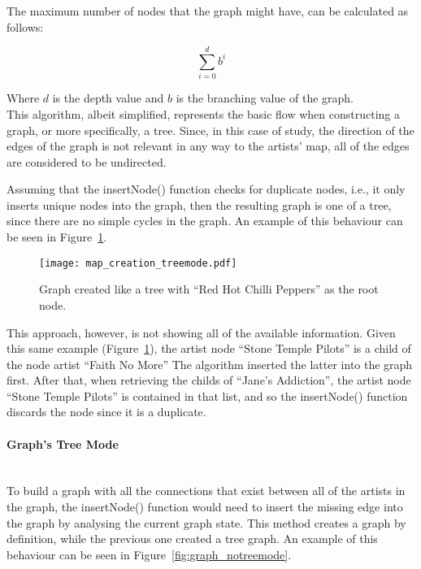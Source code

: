       The maximum number of nodes that the graph might have, can be calculated as follows:

      \begin{equation}
          \sum_{i=0}^{d} b ^ i
      \end{equation}

      Where $d$ is the depth value and $b$ is the branching value of the graph. \\

      This algorithm, albeit simplified, represents the basic flow when constructing a graph, or more specifically, a tree.
      Since, in this case of study, the direction of the edges of the graph is not relevant in any way to the artists' map, all of the edges are considered to be undirected.

      Assuming that the insertNode() function checks for duplicate nodes, i.e., it only inserts unique nodes into the graph, then the resulting graph is one of a tree, since there are no simple cycles in the graph.
      An example of this behaviour can be seen in Figure~\ref{fig:graph_treemode}.

      \begin{figure}[ht]
        \begin{center}
          \texttt{[image: map\_creation\_treemode.pdf]}
        \end{center}
        \caption{Graph created like a tree with ``Red Hot Chilli Peppers'' as the root node.}
        \label{fig:graph_treemode}
      \end{figure}

      This approach, however, is not showing all of the available information.
      Given this same example (Figure~\ref{fig:graph_treemode}), the artist node ``Stone Temple Pilots'' is a child of the node artist ``Faith No More''
      The algorithm inserted the latter into the graph first.
      After that, when retrieving the childs of ``Jane's Addiction'', the artist node ``Stone Temple Pilots'' is contained in that list, and so the insertNode() function discards the node since it is a duplicate.

      \paragraph{Graph's Tree Mode} \hfill \\
      To build a graph with all the connections that exist between all of the artists in the graph, the insertNode() function would need to insert the missing edge into the graph by analysing the current graph state.
      This method creates a graph by definition, while the previous one created a tree graph.
      An example of this behaviour can be seen in Figure~\ref{fig:graph_notreemode}.

